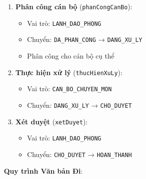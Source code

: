 \documentclass[12pt,a4paper]{article}
\begin{document}
\begin{enumerate}
    \item \textbf{Phân công cán bộ} (\texttt{phanCongCanBo}):
    \begin{itemize}
        \item Vai trò: \texttt{LANH\_DAO\_PHONG}
        \item Chuyển: \texttt{DA\_PHAN\_CONG} → \texttt{DANG\_XU\_LY}
        \item Phân công cho cán bộ cụ thể
    \end{itemize}
    
    \item \textbf{Thực hiện xử lý} (\texttt{thucHienXuLy}):
    \begin{itemize}
        \item Vai trò: \texttt{CAN\_BO\_CHUYEN\_MON}
        \item Chuyển: \texttt{DANG\_XU\_LY} → \texttt{CHO\_DUYET}
    \end{itemize}
    
    \item \textbf{Xét duyệt} (\texttt{xetDuyet}):
    \begin{itemize}
        \item Vai trò: \texttt{LANH\_DAO\_PHONG}
        \item Chuyển: \texttt{CHO\_DUYET} → \texttt{HOAN\_THANH}
    \end{itemize}
\end{enumerate}

\textbf{Quy trình Văn bản Đi}:
\end{document}
